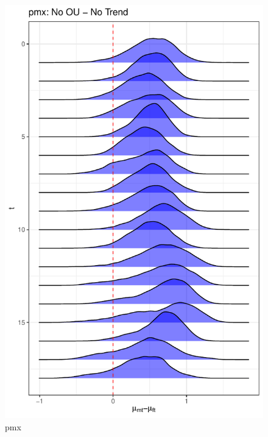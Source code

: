 \documentclass[
  12pt,
]{article}
\begin{document}
\begin{figure}

{\centering \includegraphics[width=0.9\linewidth]{../Figures/pmx/mu_diff} 

}

\caption{pmx}\label{fig:unnamed-chunk-19}
\end{figure}
\end{document}
